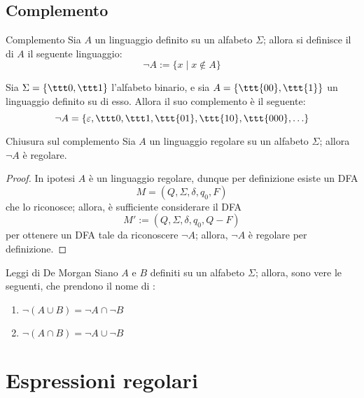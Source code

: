 \documentclass[a4paper, 12pt]{report}
\begin{document}
    \subsection{Complemento}

    \begin{frameddefn}{Complemento}
        Sia $A$ un linguaggio definito su un alfabeto $\Sigma$; allora si definisce il  di $A$ il seguente linguaggio: $$\lnot A := \{x \mid x \notin A\}$$
    \end{frameddefn}

    \begin{example}[Complemento]
        Sia $\Sigma = \{\ttt 0, \ttt 1\}$ l'alfabeto binario, e sia $A = \{ \ttt{00}, \ttt{1}\}$ un linguaggio definito su di esso. Allora il suo complemento è il seguente: $$\lnot A = \{\varepsilon, \ttt 0, \ttt 1, \ttt{01}, \ttt{10}, \ttt{000}, \ldots\}$$
    \end{example}

    \begin{framedprop}{Chiusura sul complemento}
        Sia $A$ un linguaggio regolare su un alfabeto $\Sigma$; allora $\lnot A$ è regolare.
    \end{framedprop}

    \begin{proof}
        In ipotesi $A$ è un linguaggio regolare, dunque per definizione esiste un DFA $$M = (Q, \Sigma, \delta, q_0, F)$$ che lo riconosce; allora, è sufficiente considerare il DFA $$M' := (Q, \Sigma, \delta, q_0, Q-F)$$ per ottenere un DFA tale da riconoscere $\lnot A$; allora, $\lnot A$ è regolare per definizione.
    \end{proof}

    \begin{frameddefn}{Leggi di De Morgan}
        Siano $A$ e $B$ definiti su un alfabeto $\Sigma$; allora, sono vere le seguenti, che prendono il nome di :

        \begin{enumerate}[label=\roman*), font=\itshape]
            \item $\lnot (A \cup B) = \lnot A \cap \lnot B$
            \item $\lnot (A \cap B) = \lnot A \cup \lnot B$
        \end{enumerate}
    \end{frameddefn}

    \section{Espressioni regolari}
\end{document}
